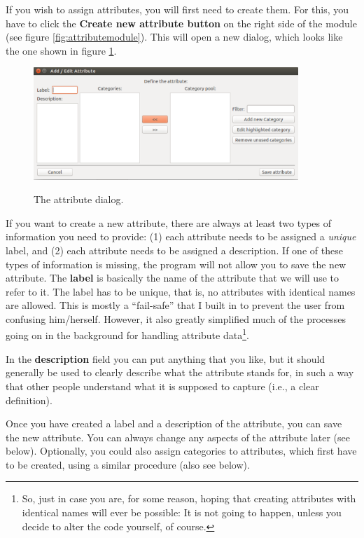 \documentclass{memoir}
\begin{document}
If you wish to assign attributes, you will first need to create them. For this, you have to click the \textbf{Create new attribute button} on the right side of the module (see figure \ref{fig:attributemodule}). This will open a new dialog, which looks like the one shown in figure \ref{fig:attributedialog}.

\begin{figure}[h!]
  \centering
  \caption{The attribute dialog.}
  \includegraphics[width=100mm]{Screenshot_8.pdf}
  \label{fig:attributedialog}
\end{figure}

If you want to create a new attribute, there are always at least two types of information you need to provide: (1) each attribute needs to be assigned a \emph{unique} label, and (2) each attribute needs to be assigned a description. If one of these types of information is missing, the program will not allow you to save the new attribute. The \textbf{label} is basically the name of the attribute that we will use to refer to it. The label has to be unique, that is, no attributes with identical names are allowed. This is mostly a ``fail-safe'' that I built in to prevent the user from confusing him/herself. However, it also greatly simplified much of the processes going on in the background for handling attribute data\footnote{So, just in case you are, for some reason, hoping that creating attributes with identical names will ever be possible: It is not going to happen, unless you decide to alter the code yourself, of course.}.  

In the \textbf{description} field you can put anything that you like, but it should generally be used to clearly describe what the attribute stands for, in such a way that other people understand what it is supposed to capture (i.e., a clear definition).

Once you have created a label and a description of the attribute, you can save the new attribute. You can always change any aspects of the attribute later (see below). Optionally, you could also assign categories to attributes, which first have to be created, using a similar procedure (also see below).
\end{document}
